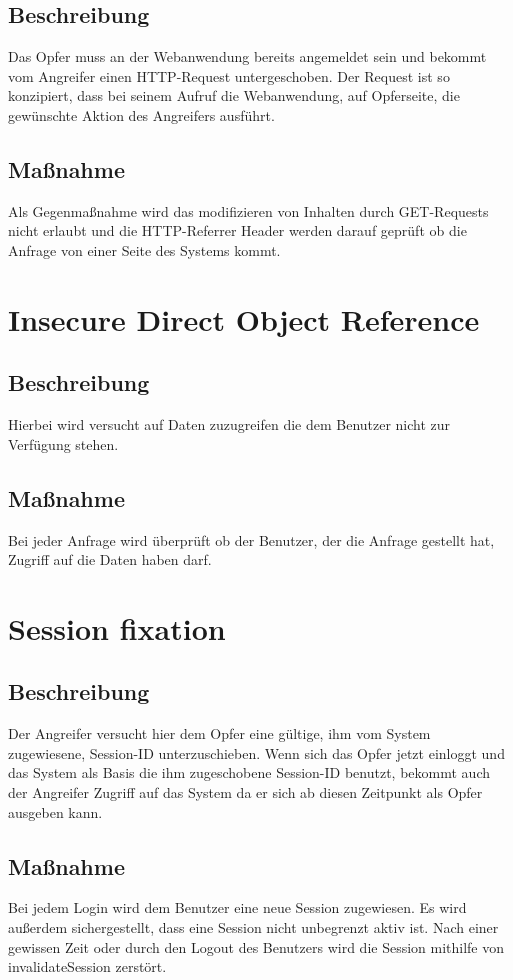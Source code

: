 \subsection{Beschreibung}
Das Opfer muss an der Webanwendung bereits angemeldet sein und bekommt vom Angreifer einen HTTP-Request untergeschoben. Der Request ist so konzipiert, dass bei seinem Aufruf die Webanwendung, auf Opferseite, die gewünschte Aktion des Angreifers ausführt.
\subsection{Maßnahme}
Als Gegenmaßnahme wird das modifizieren von Inhalten durch GET-Requests nicht erlaubt und die HTTP-Referrer Header werden darauf geprüft ob die Anfrage von einer Seite des Systems kommt.


\section{Insecure Direct Object Reference}
\subsection{Beschreibung}
Hierbei wird versucht auf Daten zuzugreifen die dem Benutzer nicht zur Verfügung stehen.
\subsection{Maßnahme}
Bei jeder Anfrage wird überprüft ob der Benutzer, der die Anfrage gestellt hat, Zugriff auf die Daten haben darf.


\section{Session fixation}
\subsection{Beschreibung}
Der Angreifer versucht hier dem Opfer eine gültige, ihm vom System zugewiesene, Session-ID unterzuschieben. Wenn sich das Opfer jetzt einloggt und das System als Basis die ihm zugeschobene Session-ID benutzt, bekommt auch der Angreifer Zugriff auf das System da er sich ab diesen Zeitpunkt als Opfer ausgeben kann.
\subsection{Maßnahme}
Bei jedem Login wird dem Benutzer eine neue Session zugewiesen. Es wird außerdem sichergestellt, dass eine Session nicht unbegrenzt aktiv ist. Nach einer gewissen Zeit oder durch den Logout des Benutzers wird die Session mithilfe von invalidateSession zerstört.